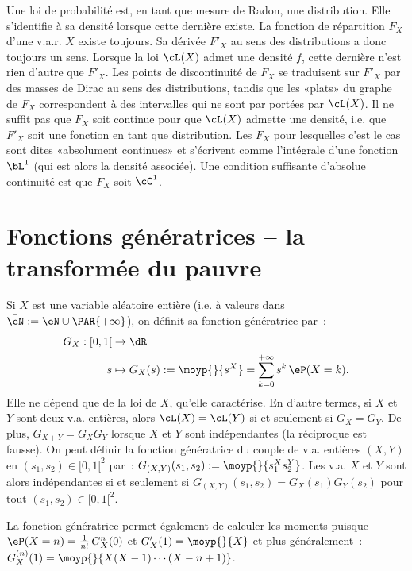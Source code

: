 \begin{rem}
  Une loi de probabilité est, en tant que mesure de Radon, une distribution.
  Elle s'identifie à sa densité lorsque cette dernière existe.  La fonction de
  répartition $F_X$ d'une v.a.r. $X$ existe toujours. Sa dérivée $F'_X$ au
  sens des distributions a donc toujours un sens. Lorsque la loi $\cL(X)$
  admet une densité $f$, cette dernière n'est rien d'autre que $F'_X$.  Les
  points de discontinuité de $F_X$ se traduisent sur $F'_X$ par des masses de
  Dirac au sens des distributions, tandis que les «plats» du graphe de $F_X$
  correspondent à des intervalles qui ne sont par portées par $\cL(X)$. Il ne
  suffit pas que $F_X$ soit continue pour que $\cL(X)$ admette une densité,
  i.e. que $F'_X$ soit une fonction en tant que distribution.  Les $F_X$ pour
  lesquelles c'est le cas sont dites «absolument continues» et s'écrivent
  comme l'intégrale d'une fonction $\bL^1$ (qui est alors la densité
  associée). Une condition suffisante d'absolue continuité est que $F_X$ soit
  $\cC^1$.
\end{rem}


%
\section{Fonctions génératrices -- la transformée du pauvre}
%

Si $X$ est une variable aléatoire entière (i.e. à valeurs dans
$\bar{\eN}:=\eN\cup\PAR{+\infty}$), on définit sa fonction génératrice par~:
\begin{align*}
  G_X:[0,1[ & \to\dR \\
         s & \mapsto G_X(s):=\moyp{}{s^X}=\sum_{k=0}^{+\infty}s^k\,\eP(X=k).
\end{align*}
Elle ne dépend que de la loi de $X$, qu'elle caractérise.  En d'autre termes,
si $X$ et $Y$ sont deux v.a. entières, alors $\cL(X)=\cL(Y)$ si et seulement
si $G_X=G_Y$. De plus, $G_{X+Y}=G_X G_Y$ lorsque $X$ et $Y$ sont indépendantes
(la réciproque est fausse). On peut définir la fonction génératrice du couple
de v.a. entières $(X,Y)$ en $(s_1,s_2)\in[0,1[^2$ par~:
$G_{(X,Y)}(s_1,s_2):=\moyp{}{s_1^Xs_2^Y}$. Les v.a. $X$ et $Y$ sont alors
indépendantes si et seulement si $G_{(X,Y)}(s_1,s_2)=G_X(s_1)G_Y(s_2)$ pour
tout $(s_1,s_2)\in[0,1[^2$.

La fonction génératrice permet également de calculer les moments puisque
$\eP(X=n)=\frac{1}{n!}\,G^{n}_X(0)$ et $G_X'(1)=\moyp{}{X}$ et plus
généralement~: $G_X^{(n)}(1)=\moyp{}{X(X-1)\cdots(X-n+1)}$.


